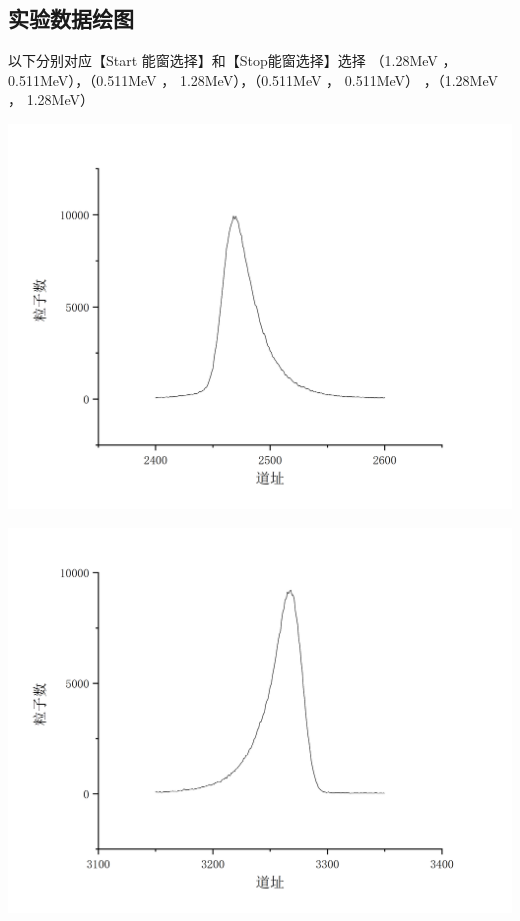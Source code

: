 \documentclass[hyperref]{ctexart}
\begin{document}
\begin{multicols}{2}
	\subsection{实验数据绘图}
	以下分别对应【Start 能窗选择】和【Stop能窗选择】选择 （1.28MeV ， 0.511MeV），（0.511MeV ， 1.28MeV），（0.511MeV ， 0.511MeV） ，（1.28MeV ， 1.28MeV） 
	\begin{center}\includegraphics[scale=0.3]{t11.png}\end{center}
	\begin{center}\includegraphics[scale=0.3]{t12.png}\end{center}

\end{multicols}
\end{document}
